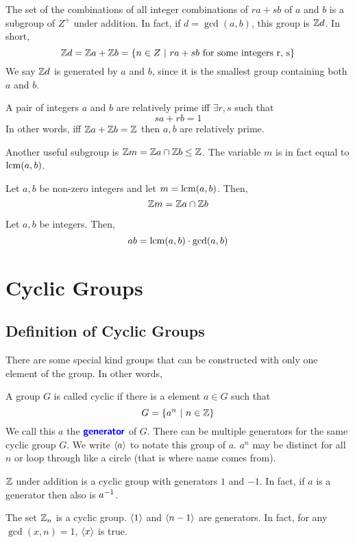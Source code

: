 \begin{theorem}
    The set of the combinations of all integer combinations of $ra + sb$ of $a$ and $b$ is a subgroup of $Z^+$ under addition. In fact, if $d
    = \gcd(a,b)$,
    this group is $\mathbb Z d$. In short,
    \[ \ZZ d = \ZZ a + \ZZ b =\{ n \in Z \ | \ ra + sb \ \text{for some integers r, s}\}\]
    We say $\mathbb Z d$ is \alert{generated} by $a$ and $b$, since it is the smallest group containing both $a$ and $b$.
\end{theorem}
\begin{corollary}
    A pair of integers $a$ and $b$ are relatively prime iff $\exists r,s$ such that
    \[ sa + rb = 1\]
    In other words, iff $\mathbb Z a + \mathbb Z b = \mathbb Z$ then $a,b$ are relatively prime.
\end{corollary}
Another useful subgroup is $\mathbb Z m = \mathbb Z a \cap \mathbb Z b \le \mathbb Z$. The variable $m$ is in fact equal to $\operatorname{lcm} (a,b)$.
\begin{theorem}
    Let $a,b$ be non-zero integers and let $m = \operatorname{lcm}(a,b)$. Then,
    \[ \mathbb Z m = \mathbb Z a \cap \mathbb Z b\]
\end{theorem}
\begin{corollary}
    Let $a,b$ be integers. Then,
    \[ ab = \operatorname{lcm}(a,b) \cdot \gcd(a,b)\]
\end{corollary}

\chapter{Cyclic Groups}
\section{Definition of Cyclic Groups}
There are some special kind groups that can be constructed with only one element of the group. In other words,
\begin{definition}
    A group $G$ is called \alert{cyclic} if there is a element $a \in G$ such that
    \[ G = \{ a^n \ | \ n \in \mathbb Z\}\]
    We call this $a$ the $\textbf{\color{blue}\sffamily generator}$ of $G$. There can be multiple generators for the same cyclic group $G$. We write $\langle{a} \rangle$ to
    notate this group of $a$.
    $a^n$ may be distinct for all $n$ or loop through like a circle (that is where name comes from).
\end{definition}
\begin{example}
    $\mathbb Z$ under addition is a cyclic group with generators $1$ and $-1$. In fact, if $a$ is a generator then also is $a^{-1}$.
\end{example}
\begin{example}
    The set $\mathbb Z_n$ is a cyclic group. $\langle{1} \rangle$ and $\langle{n-1} \rangle$ are generators. In fact, for any $\gcd(x,n)= 1$, $\langle{x} \rangle$ is true.
\end{example}
